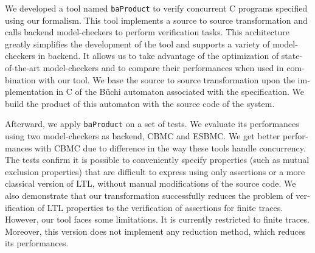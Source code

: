 \begin{otherlanguage}{english}
We developed a tool named \texttt{baProduct} to verify concurrent C programs
specified using our formalism. This tool implements a source to source
transformation and calls backend model-checkers to perform verification tasks.
This architecture greatly simplifies the development of the tool and supports a
variety of model-checkers in backend. It allows us to take advantage of the
optimization of state-of-the-art model-checkers and to compare their
performances when used in combination with our tool.
We base the source to source transformation upon the implementation in C of the
Büchi automaton associated with the specification. We build the product of this
automaton with the source code of the system.

Afterward, we apply \texttt{baProduct} on a set of tests. We evaluate its
performances using two model-checkers as backend, CBMC and ESBMC. We get better
performances with CBMC due to difference in the way these tools handle
concurrency. The tests confirm it is possible to conveniently specify properties
(such as mutual exclusion properties) that are difficult to express using only
assertions or a more classical version of LTL, without manual modifications of
the source code. We also demonstrate that our transformation successfully reduces
the problem of verification of LTL properties to the verification of
assertions for finite traces. However, our tool faces some limitations. It is
currently restricted to finite traces. Moreover, this version does not
implement any reduction method, which reduces its performances.

\end{otherlanguage}
